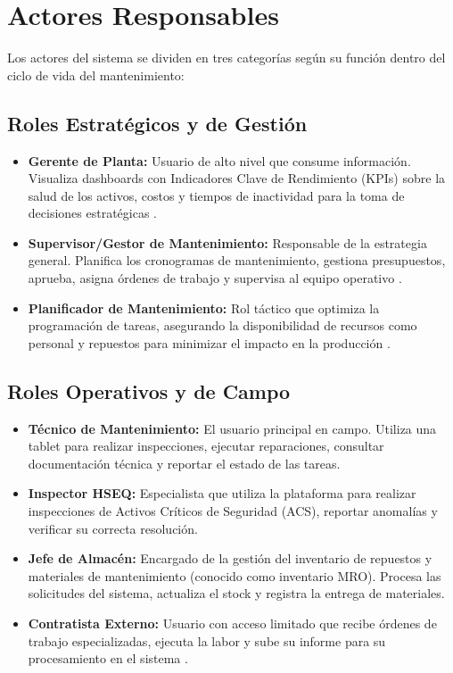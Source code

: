 \section{Actores Responsables}

Los actores del sistema se dividen en tres categorías según su función dentro del ciclo de vida del mantenimiento:

\subsection{Roles Estratégicos y de Gestión}

\begin{itemize}
    \item \textbf{Gerente de Planta:} Usuario de alto nivel que consume información. Visualiza dashboards con Indicadores Clave de Rendimiento (KPIs) sobre la salud de los activos, costos y tiempos de inactividad para la toma de decisiones estratégicas \parencite{chen:2025, tractian:2025a, wireman:2013}.
    \item \textbf{Supervisor/Gestor de Mantenimiento:} Responsable de la estrategia general. Planifica los cronogramas de mantenimiento, gestiona presupuestos, aprueba, asigna órdenes de trabajo y supervisa al equipo operativo \parencite{accruent:2025, fracttal:2024, laurila:2017, tractian:2025b}.
    \item \textbf{Planificador de Mantenimiento:} Rol táctico que optimiza la programación de tareas, asegurando la disponibilidad de recursos como personal y repuestos para minimizar el impacto en la producción \parencite{fracttal:2024, laurila:2017, tractian:2025b}.
\end{itemize}

\subsection{Roles Operativos y de Campo}

\begin{itemize}
    \item \textbf{Técnico de Mantenimiento:} El usuario principal en campo. Utiliza una tablet para realizar inspecciones, ejecutar reparaciones, consultar documentación técnica y reportar el estado de las tareas.
    \item \textbf{Inspector HSEQ:} Especialista que utiliza la plataforma para realizar inspecciones de Activos Críticos de Seguridad (ACS), reportar anomalías y verificar su correcta resolución.
    \item \textbf{Jefe de Almacén:} Encargado de la gestión del inventario de repuestos y materiales de mantenimiento (conocido como inventario MRO). Procesa las solicitudes del sistema, actualiza el stock y registra la entrega de materiales.
    \item \textbf{Contratista Externo:} Usuario con acceso limitado que recibe órdenes de trabajo especializadas, ejecuta la labor y sube su informe para su procesamiento en el sistema \parencite{fracttal:2024, honeywell:2018, laurila:2017, servicenow:sf, tractian:2025b, wireman:2013}.
\end{itemize}

